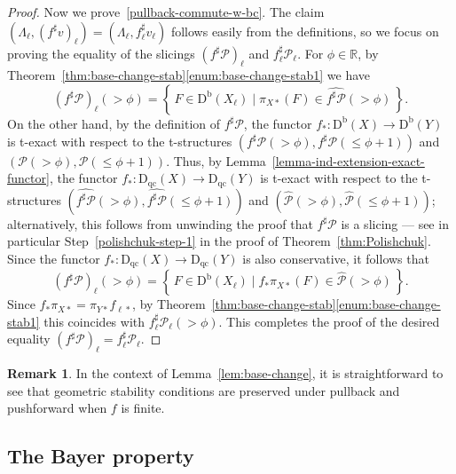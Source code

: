 \documentclass[11pt, reqno]{amsart}
\numberwithin{equation}{section}
\theoremstyle{plain}
\theoremstyle{remark}
\theoremstyle{definition}
\newtheorem{remark}[theorem]{Remark}
\theoremstyle{italicsname}
\newcommand{\st}{\mid}
\newcommand{\set}[1]{\left\{ \, #1 \, \right\}}
\newcommand{\Db}{\mathrm{D^b}}
\newcommand{\Dqc}{\mathrm{D}_{\mathrm{qc}}}
\newcommand{\cP}{\mathscr{P}}
\def\RR{\ensuremath{\mathbb{R}}}
\begin{document}
\begin{proof}
Now we prove~\ref{pullback-commute-w-bc}. 
The claim  $(\Lambda_{\ell}, (f^{\sharp}v)_{\ell}) = (\Lambda_{\ell}, f_{\ell}^{\sharp} v_{\ell})$ follows easily from the definitions, so we focus on proving the equality of the slicings $(f^{\sharp}\cP)_{\ell}$ and $f^{\sharp}_{\ell}\cP_{\ell}$. 
For $\phi \in \RR$, by Theorem~\ref{thm:base-change-stab}\ref{enum:base-change-stab1} we have 
\begin{equation*}
    (f^{\sharp}\cP)_{\ell}(> \phi) = \set{F \in \Db(X_{\ell}) \st \pi_{X*}(F) \in \widehat{f^{\sharp}\cP}(> \phi)}.
\end{equation*}
On the other hand, by the definition of $f^{\sharp}\cP$, the functor $f_* \colon \Db(X) \to \Db(Y)$ is t-exact with respect to the t-structures $(f^{\sharp}\cP(> \phi), f^{\sharp}\cP( \leq \phi+1))$ and $(\cP(> \phi), \cP(\leq \phi+1))$. 
Thus, by Lemma~\ref{lemma-ind-extension-exact-functor}, the functor $f_* \colon \Dqc(X) \to \Dqc(Y)$ is t-exact with respect to the t-structures 
$(\widehat{f^{\sharp}\cP}(> \phi), \widehat{f^{\sharp}\cP}( \leq \phi+1))$ and $(\widehat{\cP}(> \phi), \widehat{\cP}(\leq \phi+1))$; alternatively, this follows from unwinding the proof that  $f^{\sharp}\cP$ is a slicing --- see in particular Step~\ref{polishchuk-step-1} in the proof of Theorem~\ref{thm:Polishchuk}. 
Since the functor $f_* \colon \Dqc(X) \to \Dqc(Y)$ is also conservative, it follows that 
\begin{equation*}
        (f^{\sharp}\cP)_{\ell}(> \phi) = \set{F \in \Db(X_{\ell}) \st f_*\pi_{X*}(F) \in \widehat{\cP}(> \phi)}. 
\end{equation*}
Since $f_*\pi_{X*} = \pi_{Y*}f_{\ell*}$, 
by Theorem~\ref{thm:base-change-stab}\ref{enum:base-change-stab1} this coincides with $f^{\sharp}_{\ell}\cP_{\ell}(>\phi)$. 
This completes the proof of the desired equality $(f^{\sharp}\cP)_{\ell} = f^{\sharp}_{\ell}\cP_{\ell}$. 
\end{proof}

\begin{remark}\label{rmk:GeometricPushPull}
In the context of Lemma~\ref{lem:base-change}, it is straightforward to see that geometric stability conditions are preserved under pullback and pushforward when $f$ is finite. 
\end{remark}


\subsection{The Bayer property}\label{subsec:BayerConditions}
\end{document}
